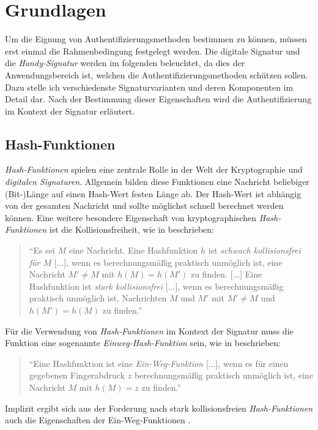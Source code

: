 \documentclass[11pt,a4paper,ngerman]{report}
\begin{document}
\chapter{Grundlagen}
Um die Eignung von Authentifizierungsmethoden bestimmen zu können, müssen erst einmal die Rahmenbedingung festgelegt werden. Die digitale Signatur und die \textit{Handy-Signatur} werden im folgenden beleuchtet, da dies der Anwendungsbereich ist, welchen die Authentifizierungsmethoden schützen sollen. Dazu stelle ich verschiedenste Signaturvarianten und deren Komponenten im Detail dar. Nach der Bestimmung dieser Eigenschaften wird die Authentifizierung im Kontext der Signatur erläutert.

\section{Hash-Funktionen}\label{sec:Hash-Funktionen}
\textit{Hash-Funktionen} spielen eine zentrale Rolle in der Welt der Kryptographie und \textit{digitalen Signaturen}. Allgemein bilden diese Funktionen eine Nachricht beliebiger (Bit-)Länge auf einen Hash-Wert festen Länge ab. Der Hash-Wert ist abhängig von der gesamten Nachricht und sollte möglichst schnell berechnet werden können. Eine weitere besondere Eigenschaft von kryptographischen \textit{Hash-Funktionen} ist die Kollisionsfreiheit, wie in \cite[S. 89]{krypt08} beschrieben: 
\begin{quote}
    ``Es sei $M$ eine Nachricht. Eine Hashfunktion $h$ ist \textit{schwach kollisionsfrei für $M$} [...], wenn es berechnungsmäßig praktisch unmöglich ist, eine Nachricht $M' \neq M$ mit $h(M) = h(M')$ zu finden. [...]
    Eine Hashfunktion ist \textit{stark kollisionsfrei} [...], wenn es berechnungsmäßig praktisch unmöglich ist, Nachrichten $M$ und $M'$ mit $M' \neq M$ und $h(M') = h(M)$ zu finden.''
\end{quote}
Für die Verwendung von \textit{Hash-Funktionen} im Kontext der Signatur muss die Funktion eine sogenannte \textit{Einweg-Hash-Funktion} sein, wie in \cite[S. 99]{krypt08} beschrieben:
\begin{quote}
    ``Eine Hashfunktion ist eine \textit{Ein-Weg-Funktion} [...], wenn es für einen gegebenen Fingerabdruck $z$ berechnungsmäßig praktisch unmöglich ist, eine Nachricht $M$ mit $h(M)=z$ zu finden.''
\end{quote}
Implizit ergibt sich aus der Forderung nach stark kollisionsfreien \textit{Hash-Funktionen} auch die Eigenschaften der Ein-Weg-Funktionen \cite[S. 99]{krypt08}.
\end{document}
